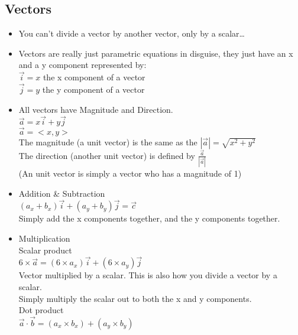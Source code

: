   \subsection{\color{BrickRed}Vectors}
  \begin{itemize}
    \item You can't divide a vector by another vector, only by a scalar\ldots\\
    \item Vectors are really just parametric equations in
      disguise, they just have an x and a y component represented
      by:\\
      \subitem $\vec{i}=x$ the x component of a vector\\
      \subitem $\vec{j}=y$ the y component of a vector\\
    \item All vectors have Magnitude and Direction.\\
      \subitem $ \vec{a}=x\vec{i}+y\vec{j} $\\
      \subitem $ \vec{a}=<x,y>$\\
        \subsubitem The magnitude (a unit vector) is the same as the $|\vec{a}|=\sqrt{x^{2}+y^{2}}$\\
	\subsubitem The direction (another unit vector) is defined by $\frac{\vec{a}}{|\vec{a}|}$\\
	\subsubitem (An unit vector is simply a vector who has a 
	magnitude of 1)\\
    \item Addition \& Subtraction\\
      \subitem $(a_x+b_x)\vec{i}+(a_y+b_y)\vec{j}=\vec{c}$\\
      \subitem Simply add the x components together, and the y
      components together.\\ 
    \item Multiplication\\
      \subitem Scalar product\\
      	\subsubitem $6 \times \vec{a}=(6\times
	a_x)\vec{i}+(6\times a_y)\vec{j}$\\
        \subsubitem Vector multiplied by a scalar. This is also how you divide a vector by a
	scalar.\\
        \subsubitem Simply multiply the scalar out to both the x
	and y components.\\
      \subitem Dot product\\
        \subsubitem $\vec{a}\cdot \vec{b}=(a_x\times b_x)+(a_y
        \times b_y)$\\

\end{itemize}
